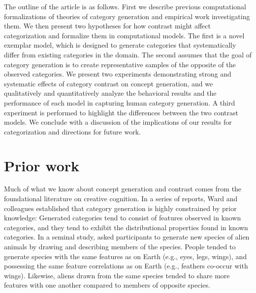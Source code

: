 \documentclass[12pt]{article}
\begin{document}
\begin{flushleft}
The outline of the article is as follows. First we describe previous
computational formalizations of theories of category generation and empirical
work investigating them. We then present two hypotheses for how contrast might
affect categorization and formalize them in computational models. The first is a
novel exemplar model, which is designed to generate categories that
systematically differ from existing categories in the domain. The second assumes
that the goal of category generation is to create representative samples of the
opposite of the observed categories. We present two experiments demonstrating
strong and systematic effects of category contrast on concept generation, and we
qualitatively and quantitatively analyze the behavioral results and the performance of each model in
capturing human category generation. A third experiment is performed to
highlight the differences between the two contrast models. We conclude with a
discussion of the implications of our results for categorization and directions
for future work.

\section{Prior work}

Much of what we know about concept generation and contrast comes from the
foundational literature on creative cognition. In a series of reports, Ward and
colleagues
\citep{ward1995s,ward1994structured,marsh1999inadvertent,ward2002role,smith1993constraining}
established that category generation is highly constrained by prior knowledge:
Generated categories tend to consist of features observed in known categories,
and they tend to exhibit the distributional properties found in known
categories. In a seminal study, \cite{ward1994structured} asked participants to
generate new species of alien animals by drawing and describing members of the
species. People tended to generate species with the same features as on Earth
(e.g., eyes, legs, wings), and possessing the same feature correlations as on
Earth (e.g., feathers co-occur with wings). Likewise, aliens drawn from the same
species tended to share more features with one another compared to members of
opposite species.


\end{flushleft}
\end{document}
